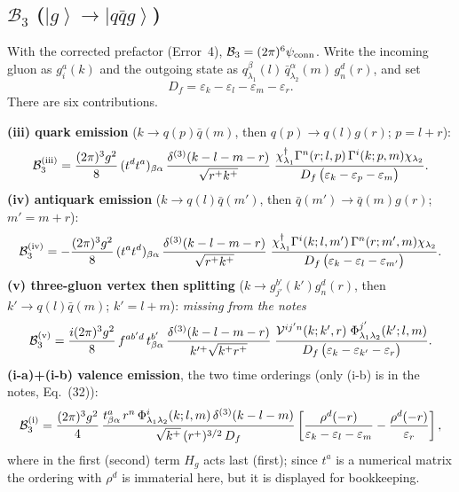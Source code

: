 \documentclass[11pt]{article}
\newcommand{\eps}{\varepsilon}
\newcommand{\dg}{\dagger}
\newcommand{\dthree}{\delta^{(3)}}
\newcommand{\ket}[1]{\left|#1\right\rangle}
\newcommand{\Gam}{\Gamma}
\newcommand{\Ph}{\Phi}
\newcommand{\Vg}{\mathcal{V}}
\newcommand{\qk}[3]{q^{#1}_{#2}(#3)}
\newcommand{\aqk}[3]{\bar q^{#1}_{#2}(#3)}
\newcommand{\gl}[3]{g^{#1}_{#2}(#3)}
\begin{document}
\subsection{$\mathcal B_3$ ($\ket{g}\to\ket{q\bar q g}$)}

With the corrected prefactor (Error~4), $\mathcal B_{3}=(2\pi)^{6}\psi_{\rm conn}$. Write the
incoming gluon as $\gl{a}{i}{k}$ and the outgoing state as
$\qk{\beta}{\lambda_1}{l}\,\aqk{\alpha}{\lambda_2}{m}\,\gl{d}{n}{r}$, and set
\begin{equation}
D_{f}=\eps_{k}-\eps_{l}-\eps_{m}-\eps_{r}.
\end{equation}
There are six contributions.

\begin{res}
\textbf{(iii) quark emission} ($k\to q(p)\bar q(m)$, then $q(p)\to q(l)g(r)$; $p=l+r$):
\begin{equation}
\mathcal B_{3}^{(\rm iii)}=\frac{(2\pi)^{3}g^{2}}{8}\,(t^{d}t^{a})_{\beta\alpha}\,
\frac{\dthree(k-l-m-r)}{\sqrt{r^{+}k^{+}}}\;
\frac{\chi^{\dg}_{\lambda_1}\Gam^{n}(r;l,p)\,\Gam^{i}(k;p,m)\chi_{\lambda_2}}
{D_{f}\,\big(\eps_{k}-\eps_{p}-\eps_{m}\big)} .
\end{equation}
\textbf{(iv) antiquark emission} ($k\to q(l)\bar q(m')$, then $\bar q(m')\to\bar q(m)g(r)$;
$m'=m+r$):
\begin{equation}
\mathcal B_{3}^{(\rm iv)}=-\frac{(2\pi)^{3}g^{2}}{8}\,(t^{a}t^{d})_{\beta\alpha}\,
\frac{\dthree(k-l-m-r)}{\sqrt{r^{+}k^{+}}}\;
\frac{\chi^{\dg}_{\lambda_1}\Gam^{i}(k;l,m')\,\Gam^{n}(r;m',m)\chi_{\lambda_2}}
{D_{f}\,\big(\eps_{k}-\eps_{l}-\eps_{m'}\big)} .
\end{equation}
\textbf{(v) three-gluon vertex then splitting} ($k\to g^{b'}_{j'}(k')g^{d}_{n}(r)$, then
$k'\to q(l)\bar q(m)$; $k'=l+m$): \emph{missing from the notes}
\begin{equation}
\mathcal B_{3}^{(\rm v)}=\frac{i(2\pi)^{3}g^{2}}{8}\,f^{ab'd}\,t^{b'}_{\beta\alpha}\,
\frac{\dthree(k-l-m-r)}{k'^{+}\sqrt{k^{+}r^{+}}}\;
\frac{\Vg^{ij'n}(k;k',r)\;\Ph^{j'}_{\lambda_1\lambda_2}(k';l,m)}
{D_{f}\,\big(\eps_{k}-\eps_{k'}-\eps_{r}\big)} .
\end{equation}
\textbf{(i-a)+(i-b) valence emission}, the two time orderings (only (i-b) is in the notes, Eq.~(32)):
\begin{equation}
\mathcal B_{3}^{(\rm i)}=\frac{(2\pi)^{3}g^{2}}{4}\,
\frac{t^{a}_{\beta\alpha}\,r^{n}\,\Ph^{i}_{\lambda_1\lambda_2}(k;l,m)\,\dthree(k-l-m)}
{\sqrt{k^{+}}\,(r^{+})^{3/2}\,D_{f}}
\left[\frac{\rho^{d}(-r)}{\eps_{k}-\eps_{l}-\eps_{m}}-\frac{\rho^{d}(-r)}{\eps_{r}}\right],
\end{equation}
where in the first (second) term $H_{g}$ acts last (first); since $t^{a}$ is a numerical matrix
the ordering with $\rho^{d}$ is immaterial here, but it is displayed for bookkeeping.


\end{res}
\end{document}

